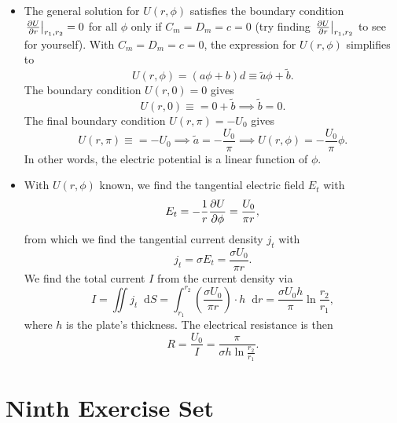 \documentclass[11pt, a4paper]{article}
\newcommand{\diff}{\mathop{}\!\mathrm{d}} %
\renewcommand{\t}[1]{\tilde{#1}} %
\begin{document}
\begin{itemize}
	\item The general solution for $ U(r, \phi) $ satisfies the boundary condition $ \eval{\pdv{U}{r}}_{r_{1}, r_{2}} = 0 $ for all $ \phi $ only if $ C_{m} = D_{m} = c = 0 $ (try finding $ \eval{\pdv{U}{r}}_{r_{1}, r_{2}}  $ to see for yourself). With $  C_{m} = D_{m} = c = 0 $, the expression for $ U(r, \phi) $ simplifies to
	\begin{equation*}
		U(r, \phi) = (a \phi + b)d \equiv \t{a}\phi + \t{b}.
	\end{equation*}
	The boundary condition $ U(r, 0) = 0 $ gives
	\begin{equation*}
		U(r, 0) \equiv = 0 + \t{b} \implies \t{b} = 0.
	\end{equation*}
	The final boundary condition $ U(r, \pi) = -U_{0} $ gives
	\begin{equation*}
		U(r, \pi) \equiv = - U_{0} \implies \t{a} = -\frac{U_{0}}{\pi} \implies U(r, \phi) = - \frac{U_{0}}{\pi} \phi.
	\end{equation*}
	In other words, the electric potential is a linear function of $ \phi $. 
	
	\item With $ U(r, \phi) $ known, we find the tangential electric field $ E_{t} $ with
	\begin{equation*}
		E_{t} = - \frac{1}{r}\pdv{U}{\phi} = \frac{U_{0}}{\pi r},
	\end{equation*}
	from which we find the tangential current density $ j_{t} $ with
	\begin{equation*}
		j_{t} = \sigma E_{t} = \frac{\sigma U_{0}}{\pi r}.
	\end{equation*}
	We find the total current $ I $ from the current density via
	\begin{equation*}
		I = \iint j_{t} \diff S = \int_{r_{1}}^{r_{2}} \left(\frac{\sigma U_{0}}{\pi r}\right) \cdot h \diff r = \frac{\sigma U_{0} h}{\pi} \ln \frac{r_{2}}{r_{1}},
	\end{equation*}
	where $ h $ is the plate's thickness. The electrical resistance is then
	\begin{equation*}
		R = \frac{U_{0}}{I} = \frac{\pi}{\sigma h \ln \frac{r_{2}}{r_{1}}}.
	\end{equation*}
\end{itemize}

\newpage
\section{Ninth Exercise Set}
\end{document}
